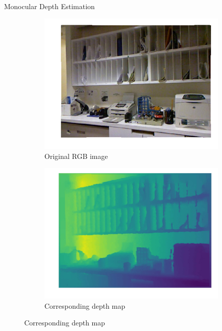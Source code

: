 \documentclass{cubeamer}
\begin{document}
\begin{frame}{Monocular Depth Estimation}
    \begin{figure}
        \centering
        \begin{subfigure}[b]{0.35\textwidth}
            \centering
            \includegraphics[width=\textwidth]{figures/depthmap_real.jpg}
            \caption{Original RGB image \cite{nyu}}
        \end{subfigure}
        \hspace{2cm}
        \begin{subfigure}[b]{0.35\textwidth}
            \centering
            \includegraphics[width=\textwidth]{figures/depthmap_depth.jpg}
            \caption{Corresponding depth map \cite{chaijirawiwat_monocular_2019}}
        \end{subfigure}
    \end{figure}
\end{frame}
\end{document}
